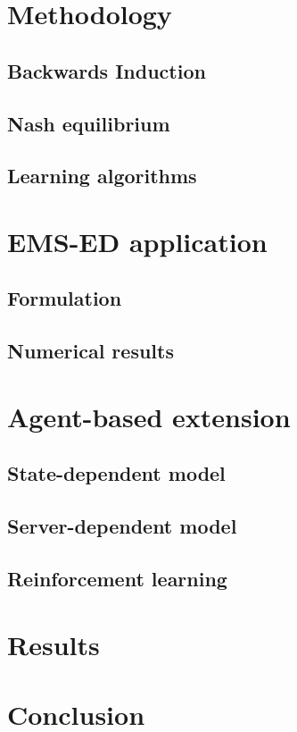 \documentclass{article}
\begin{document}
    \section{Methodology}
        \subsection{Backwards Induction}
        \subsection{Nash equilibrium}
        \subsection{Learning algorithms}
    \section{EMS-ED application}
        \subsection{Formulation}
        \subsection{Numerical results}
    \section{Agent-based extension}
        \subsection{State-dependent model}
        \subsection{Server-dependent model}
        \subsection{Reinforcement learning}
    \section{Results}
    \section{Conclusion}
\end{document}
